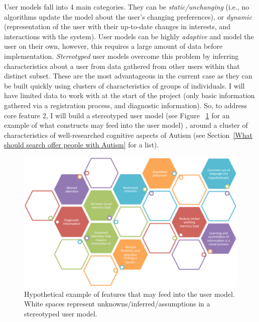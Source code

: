 \documentclass[a4paper, 10pt]{article}
\begin{document}
User models fall into 4 main categories. They can be \textit{static/unchanging} (i.e., no algorithms update the model about the user's changing preferences), or \textit{dynamic} (representation of the user with their up-to-date changes in interests, and interactions with the system). User models can be highly \textit{adaptive} and model the user on their own, however, this requires a large amount of data before implementation. \textit{Stereotyped} user models overcome this problem by inferring characteristics about a user from data gathered from other users within that distinct subset. These are the most advantageous in the current case as they can be built quickly using clusters of characteristics of groups of individuals. I will have limited data to work with at the start of the project (only basic information gathered via a registration process, and diagnostic information). So, to address core feature 2, I will build a stereotyped user model (see Figure ~\ref{usermodelconstruct} for an example of what constructs may feed into the user model) , around a cluster of characteristics of well-researched cognitive aspects of Autism (see Section~\ref{What should search offer people with Autism} for a list).


\begin{figure}[H]
\begin{center}
    \includegraphics[scale=0.6]{usermodelconstruct}
    \caption{Hypothetical example of features that may feed into the user model. White spaces represent unknowns/inferred/assumptions in a stereotyped user model.}
    \label{usermodelconstruct}
\end{center}
\end{figure}
\end{document}
